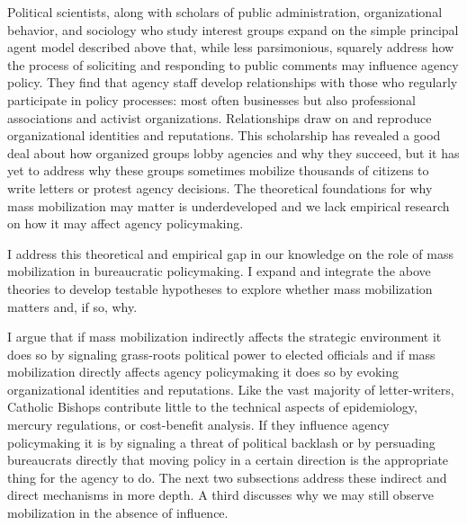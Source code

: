 Political scientists, along with scholars of public administration, organizational behavior, and sociology who study interest groups expand on the simple principal agent model described above that, while less parsimonious, squarely address how the process of soliciting and responding to public comments may influence agency policy. They find that agency staff develop relationships with those who regularly participate in policy processes: most often businesses but also professional associations and activist organizations. Relationships draw on and reproduce organizational identities and reputations. This scholarship has revealed a good deal about how organized groups lobby agencies and why they succeed, but it has yet to address why these groups sometimes mobilize thousands of citizens to write letters or protest agency decisions. The theoretical foundations for why mass mobilization may matter is underdeveloped and we lack empirical research on how it may affect agency policymaking. 

I address this theoretical and empirical gap in our knowledge on the role of mass mobilization in bureaucratic policymaking. I expand and integrate the above theories to develop testable hypotheses %
to explore whether mass mobilization matters and, if so, why. 

I argue that if mass mobilization indirectly affects the strategic environment it does so by signaling grass-roots political power to elected officials and if mass mobilization directly affects agency policymaking it does so by evoking organizational identities and reputations. 
Like the vast majority of letter-writers, Catholic Bishops contribute little to the technical aspects of epidemiology, mercury regulations, or cost-benefit analysis. If they influence agency policymaking it is 
by signaling a threat of political backlash or 
by persuading bureaucrats directly that moving policy in a certain direction is the appropriate thing for the agency to do. 
The next two subsections address these indirect and direct mechanisms in more depth. A third discusses why we may still observe mobilization in the absence of influence. 




